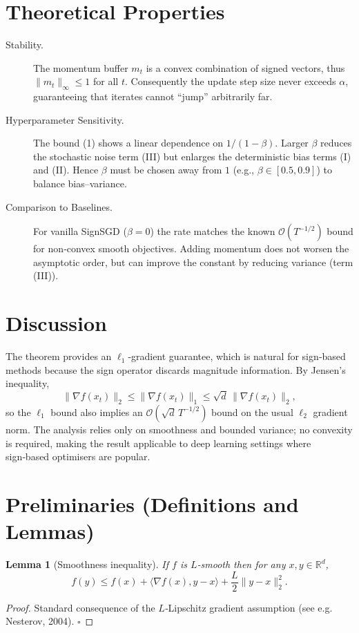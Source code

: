 \documentclass[11pt]{article}
\newtheorem{lemma}{Lemma}[section]
\begin{document}
\section*{Theoretical Properties}
\begin{description}
\item[Stability.] The momentum buffer $m_{t}$ is a convex combination of signed vectors, thus $\|m_{t}\|_{\infty}\le 1$ for all $t$. Consequently the update step size never exceeds $\alpha$, guaranteeing that iterates cannot ``jump'' arbitrarily far.
\item[Hyperparameter Sensitivity.] The bound (1) shows a linear dependence on $1/(1-\beta)$. Larger $\beta$ reduces the stochastic noise term (III) but enlarges the deterministic bias terms (I) and (II). Hence $\beta$ must be chosen away from $1$ (e.g., $\beta\in[0.5,0.9]$) to balance bias–variance.
\item[Comparison to Baselines.] For vanilla SignSGD ($\beta=0$) the rate matches the known $\mathcal{O}(T^{-1/2})$ bound for non‑convex smooth objectives. Adding momentum does not worsen the asymptotic order, but can improve the constant by reducing variance (term (III)).
\end{description}

\section*{Discussion}
The theorem provides an $\ell_{1}$‑gradient guarantee, which is natural for sign‑based methods because the sign operator discards magnitude information. By Jensen’s inequality,
\[
    \|\nabla f(x_{t})\|_{2}\le \|\nabla f(x_{t})\|_{1}\le \sqrt{d}\,\|\nabla f(x_{t})\|_{2},
\]
so the $\ell_{1}$ bound also implies an $\mathcal{O}(\sqrt{d}\,T^{-1/2})$ bound on the usual $\ell_{2}$ gradient norm. The analysis relies only on smoothness and bounded variance; no convexity is required, making the result applicable to deep learning settings where sign‑based optimisers are popular.

\newpage
\section*{Preliminaries (Definitions and Lemmas)}
\begin{lemma}[Smoothness inequality]\label{lem:smooth}
If $f$ is $L$‑smooth then for any $x,y\in\mathbb{R}^{d}$,
\[
    f(y) \le f(x) + \langle \nabla f(x),y-x\rangle + \frac{L}{2}\|y-x\|_{2}^{2}. \tag{2}
\]
\end{lemma}
\begin{proof}
Standard consequence of the $L$‑Lipschitz gradient assumption (see e.g. Nesterov, 2004). \hfill $\square$
\end{proof}
\end{document}
